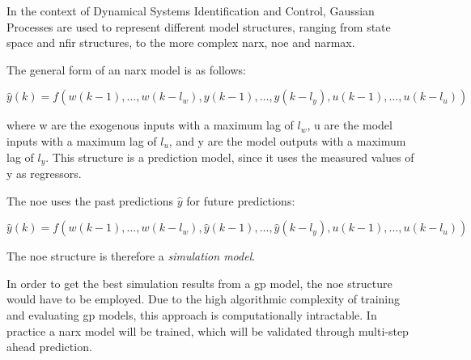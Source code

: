 In the context of Dynamical Systems Identification and Control, Gaussian
Processes are used to represent different model structures, ranging from state
space and \acrshort{nfir} structures, to the more complex \acrshort{narx},
\acrshort{noe} and \acrshort{narmax}. 


The general form of an \acrfull{narx} model is as follows:

\begin{equation}
    \hat{y}(k) =
    f(w(k-1),\dots,w(k-l_w),y(k-1),\dots,y(k-l_y),u(k-1),\dots,u(k-l_u))
\end{equation}

where w are the exogenous inputs with a maximum lag of $l_w$, u are the model
inputs with a maximum lag of $l_u$, and y are the model outputs with a maximum
lag of $l_y$. This structure is a prediction model, since it uses the measured
values of y as regressors.

The \acrfull{noe} uses the past predictions $\hat{y}$ for future predictions:

\begin{equation}
    \hat{y}(k) =
    f(w(k-1),\dots,w(k-l_w),\hat{y}(k-1),\dots,\hat{y}(k-l_y),u(k-1),\dots,u(k-l_u))
\end{equation}

The \acrshort{noe} structure is therefore a \textit{simulation model}.

In order to get the best simulation results from a \acrshort{gp} model, the
\acrshort{noe} structure would have to be employed. Due to the high algorithmic
complexity of training and evaluating \acrshort{gp} models, this approach is
computationally intractable. In practice a \acrshort{narx} model will be trained,
which will be validated through multi-step ahead prediction.

\clearpage
